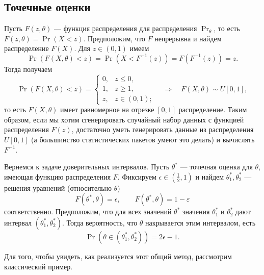 \subsection{Точечные оценки}
Пусть $F(z, \theta)$ --- функция распределения для распределения $\Pr_\theta$, то есть $F(z, \theta) = \Pr(X < z)$.
Предположим, что $F$ непрерывна и найдем распределение $F(X)$. Для $z \in (0, 1)$ имеем
\[
    \Pr(F(X, \theta) < z) = \Pr(X < F^{-1}(z)) = F(F^{-1}(z)) = z.
\]
Тогда получаем
\[
    \Pr(F(X, \theta) < z) =
    \begin{cases}
        0, & z \leqslant 0,\\
        1, & z \geqslant 1,\\
        z, & z \in (0, 1);
    \end{cases}
    \quad \Rightarrow \quad
    F(X, \theta) \sim U[0, 1],
\]
то есть $F(X, \theta)$ имеет равномерное на отрезке $[0, 1]$ распределение.
Таким образом, если мы хотим сгенерировать случайный набор данных с функцией распределения $F(z)$, достаточно уметь генерировать данные из распределения $U[0, 1]$ (а большинство статистических пакетов умеют это делать) и вычислять $F^{-1}$.

Вернемся к задаче доверительных интервалов.
Пусть $\theta^*$ --- точечная оценка для $\theta$, имеющая функцию распределения $F$.
Фиксируем $\epsilon \in (\frac12, 1)$ и найдем $\theta_1^*, \theta_2^*$ --- решения уравнений (относительно $\theta$)
\[
    F(\theta^*, \theta) = \epsilon, \qquad F(\theta^*, \theta) = 1 - \varepsilon
\]
соответственно. Предположим, что для всех значений $\theta^*$ значения $\theta_1^*$ и $\theta_2^*$ дают интервал $(\theta_1^*, \theta_2^*)$.
Тогда вероятность, что $\theta$ накрывается этим интервалом, есть
\[
    \Pr(\theta \in (\theta_1^*, \theta_2^*)) = 2\epsilon - 1.
\]

Для того, чтобы увидеть, как реализуется этот общий метод, рассмотрим классический пример.

